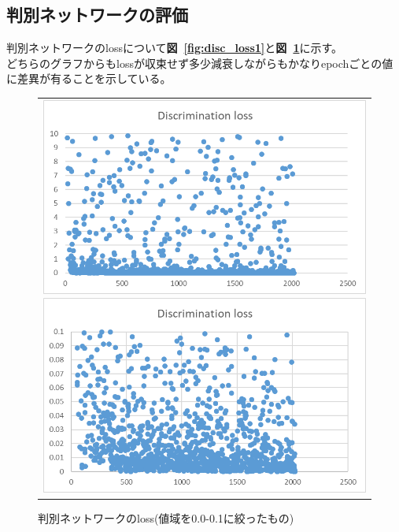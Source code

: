 \documentclass[a4j, 11pt]{jreport}
\newcommand{\figref}[1]{\textbf{図~\ref{#1}}}
\begin{document}
\subsection{判別ネットワークの評価}
判別ネットワークのlossについて\figref{fig:disc_loss1}と\figref{fig:disc_loss2}に示す。\\
どちらのグラフからもlossが収束せず多少減衰しながらもかなりepochごとの値に差異が有ることを示している。\\
\begin{figure}[H]
	\centering
	  \begin{tabular}{c}
		\begin{minipage}{0.50\hsize}
		  \centering
			\includegraphics[scale=0.5]
			{images/result/loss/discrimination_loss1.png}
			\caption{判別ネットワークのloss}
			\label{fig:disc_loss1}
		\end{minipage}
   
   
		\begin{minipage}{0.50\hsize}
		  \centering
			\includegraphics[scale=0.5]
							{images/result/loss/discrimination_loss2.png}
							\caption{判別ネットワークのloss(値域を0.0-0.1に絞ったもの)}
							\label{fig:disc_loss2}
		\end{minipage} \\
	\end{tabular}
\end{figure}  
\end{document}
